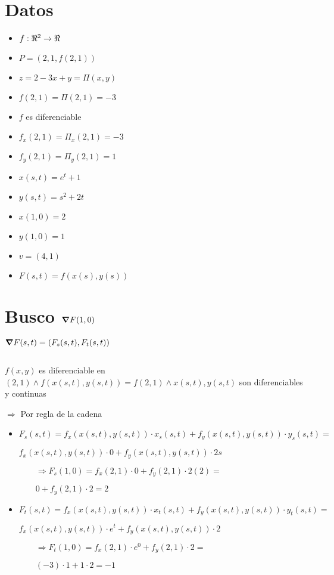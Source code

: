 \documentclass[../parcial.tex]{subfiles}
\begin{document}
    \section*{Datos}

    \begin{itemize}
        \item $f: \real^2 \to \real$
        \item $P = (2,1,f(2,1))$
        \item $z = 2 - 3x + y = \Pi(x,y)$
        \item $f(2,1) = \Pi(2,1) = -3$
        \item $f$ es diferenciable
        \item $f_x(2,1) = \Pi_x(2,1) = -3 $
        \item $f_y(2,1) = \Pi_y(2,1) = 1 $
        \item $x(s,t) = e^t + 1$
        \item $y(s,t) = s^2 + 2t$
        \item $x(1,0) = 2$
        \item $y(1,0) = 1$
        \item $v = (4,1)$
        \item $F(s,t) = f(x(s),y(s))$
    \end{itemize}

    \section*{Busco $\grad F(1,0)$}

    $ \grad F(s,t) = (F_s(s,t), F_t(s,t)) $

    $ $

    $f(x,y)$ es diferenciable en $(2,1) \wedge f(x(s,t), y(s,t)) = f(2,1) \wedge x(s,t), y(s,t)$ son diferenciables y continuas
    
    $ \Rightarrow $ Por regla de la cadena

    \begin{itemize}
        \item $ F_s(s,t) = f_x(x(s,t),y(s,t))\cdot x_s(s,t) + f_y(x(s,t), y(s,t))\cdot y_s(s,t) = $

            $f_x(x(s,t),y(s,t))\cdot 0 + f_y(x(s,t), y(s,t))\cdot 2s$

            $ \qquad \Rightarrow F_s(1,0) = f_x(2,1)\cdot 0 + f_y(2, 1)\cdot 2(2) =$

            $ \qquad 0 + f_y(2,1) \cdot 2 = 2 $

        \item $ F_t(s,t) = f_x(x(s,t),y(s,t))\cdot x_t(s,t) + f_y(x(s,t), y(s,t))\cdot y_t(s,t) = $

            $f_x(x(s,t),y(s,t))\cdot e^t + f_y(x(s,t), y(s,t))\cdot 2 $

            $ \qquad \Rightarrow F_t(1,0) = f_x(2,1)\cdot e^0 + f_y(2,1)\cdot 2 =$

            $ \qquad (-3)\cdot1 + 1 \cdot 2 = -1$

    \end{itemize}
\end{document}
